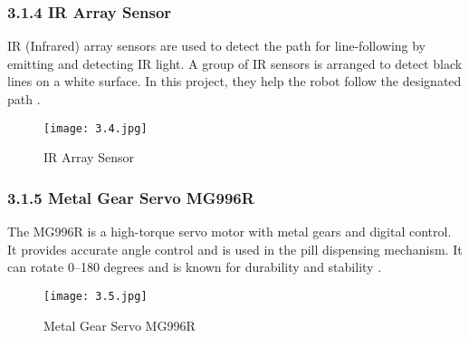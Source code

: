 \subsubsection*{3.1.4 IR Array Sensor}
IR (Infrared) array sensors are used to detect the path for line-following by emitting and detecting IR light. A group of IR sensors is arranged to detect black lines on a white surface. In this project, they help the robot follow the designated path \cite{10}.

\begin{figure}[H]
    \centering
    \texttt{[image: 3.4.jpg]}
    \caption{IR Array Sensor}
    \label{fig:3.4}
\end{figure}

\subsubsection*{3.1.5 Metal Gear Servo MG996R}
The MG996R is a high-torque servo motor with metal gears and digital control. It provides accurate angle control and is used in the pill dispensing mechanism. It can rotate 0–180 degrees and is known for durability and stability \cite{11}.

\begin{figure}[H]
    \centering
    \texttt{[image: 3.5.jpg]}
    \caption{Metal Gear Servo MG996R}
    \label{fig:3.5}
\end{figure}
